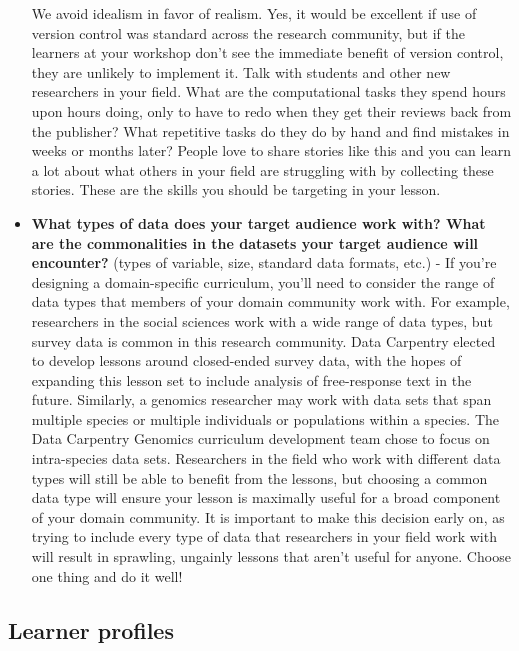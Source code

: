\documentclass[
]{book}
\begin{document}
\begin{itemize}
  We avoid idealism in favor of realism. Yes, it would be excellent if use of version control was standard
  across the research community, but if the learners at your workshop don't see the immediate benefit of version
  control, they are unlikely to implement it. Talk with students and other new researchers in your field. What are
  the computational tasks they spend hours upon hours doing, only to have to redo when they get their reviews
  back from the publisher? What repetitive tasks do they do by hand and find mistakes in weeks or months later?
  People love to share stories like this and you can learn a lot about what others in your field are struggling with
  by collecting these stories. These are the skills you should be targeting in your lesson.
\item
  \textbf{What types of data does your target audience work with? What are the commonalities in the datasets your target audience will encounter?} (types of variable, size, standard data formats, etc.) - If you're designing
  a domain-specific curriculum, you'll need to consider the range of data types that members of your domain
  community work with. For example, researchers in the social sciences work with a wide range of data types, but
  survey data is common in this research community. Data Carpentry elected to develop lessons around closed-ended
  survey data, with the hopes of expanding this lesson set to include analysis of free-response text in the future.
  Similarly, a genomics researcher may work with data sets that span multiple species or multiple individuals or
  populations within a species. The Data Carpentry Genomics curriculum development team chose to focus on
  intra-species data sets. Researchers in the field who work with different data types will still be able to
  benefit from the lessons, but choosing a common data type will ensure your lesson is maximally useful for a broad
  component of your domain community. It is important to make this decision early on, as trying to include every
  type of data that researchers in your field work with will result in sprawling, ungainly lessons that aren't
  useful for anyone. Choose one thing and do it well!
\end{itemize}

\hypertarget{learner-profiles}{%
\subsection{Learner profiles}\label{learner-profiles}}
\end{document}
